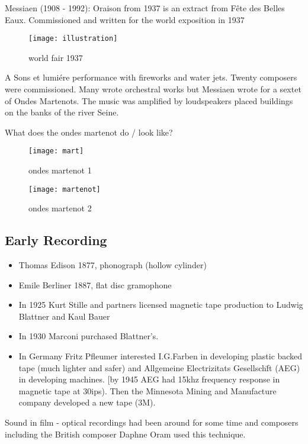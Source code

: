 Messiaen (1908 - 1992): Oraison from 1937 is an extract from F\^ete des Belles Eaux. Commissioned and written for the world exposition in 1937

\begin{figure}[H]
\centering
\texttt{[image: illustration]}\caption{world fair 1937}
\label{fig:worldfair}
\end{figure}

A Sons et lumi\'ere performance with fireworks and water jets. Twenty composers were commissioned. Many wrote orchestral works but Messiaen wrote for a sextet of Ondes Martenots. The music was amplified by loudspeakers placed buildings on the banks of the river Seine.

What does the ondes martenot do / look like?

\begin{figure}[H]
\centering
\texttt{[image: mart]}\caption{ondes martenot 1}
\label{fig:worldfair}
\end{figure}

\begin{figure}[H]
\centering
\texttt{[image: martenot]}\caption{ondes martenot 2}
\label{fig:worldfair}
\end{figure}

\subsection{Early Recording}
\begin{itemize}
\item Thomas Edison 1877, phonograph (hollow cylinder)
\item Emile Berliner 1887, flat disc gramophone
\item In 1925 Kurt Stille and partners licensed magnetic tape production to Ludwig Blattner and Kaul Bauer
\item In 1930 Marconi purchased Blattner's.
\item In Germany Fritz Pfleumer interested I.G.Farben in developing plastic backed tape (much lighter and safer) and Allgemeine Electrizitats Gesellsch\"ft (AEG) in developing machines. [by 1945 AEG had 15khz frequency response in magnetic tape at 30ips). Then the Minnesota Mining and Manufacture company developed a new tape (3M).
\end{itemize}

Sound in film - optical recordings had been around for some time and composers including the British composer Daphne Oram used this technique.

